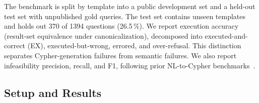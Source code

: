 \documentclass[sigconf,authordraft]{acmart}
\newcommand{\addedcite}[1]{\begingroup\setlength{\fboxsep}{1pt}\colorbox{yellow}{\cite{#1}}\endgroup}
\begin{document}
The benchmark is split by template into a public development set and a held-out test set with unpublished gold queries. The test set contains unseen templates and holds out 370 of \num{1394} questions (26.5\,\%). We report execution accuracy (result-set equivalence under canonicalization), decomposed into executed-and-correct (EX), executed-but-wrong, errored, and over-refusal. This distinction separates Cypher-generation failures from semantic failures. We also report infeasibility precision, recall, and F1, 
following prior NL-to-Cypher benchmarks~\cite{feng_cypherbench_2025, li_bird_2023}.


\subsection{Setup and Results}\label{subsec:experiments_setup}
\end{document}

